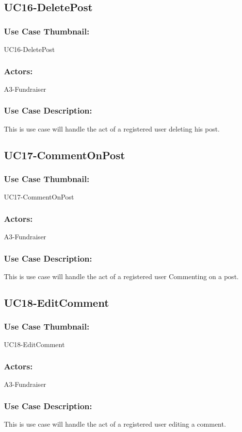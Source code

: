 \documentclass[11pt, openany]{report}
\begin{document}
\subsection{UC16-DeletePost}
\label{sUC16}
\subsubsection*{Use Case Thumbnail:}
UC16-DeletePost
\subsubsection*{Actors:}
A3-Fundraiser
\subsubsection*{Use Case Description:}
This is use case will handle the act of a registered user deleting his post.

\subsection{UC17-CommentOnPost}
\label{sUC17}
\subsubsection*{Use Case Thumbnail:}
UC17-CommentOnPost
\subsubsection*{Actors:}
A3-Fundraiser
\subsubsection*{Use Case Description:}
This is use case will handle the act of a registered user Commenting on a post.


\subsection{UC18-EditComment}
\label{sUC18}
\subsubsection*{Use Case Thumbnail:}
UC18-EditComment
\subsubsection*{Actors:}
A3-Fundraiser
\subsubsection*{Use Case Description:}
This is use case will handle the act of a registered user editing a comment.
\end{document}
